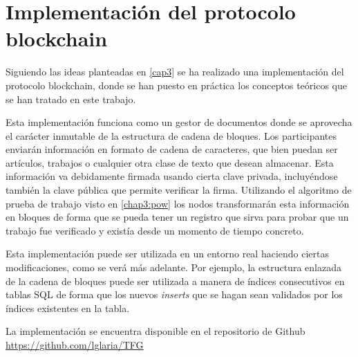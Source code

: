 \cleardoublepage

\chapter{Implementación del protocolo blockchain}
Siguiendo las ideas planteadas en \ref{cap3} se ha realizado una implementación del protocolo blockchain, donde se han puesto en práctica los conceptos teóricos que se han tratado en este trabajo. 


Esta implementación funciona como un gestor de documentos donde se aprovecha el carácter inmutable de la estructura de cadena de bloques. Los participantes enviarán información en formato de cadena de caracteres, que bien puedan ser artículos, trabajos o cualquier otra clase de texto que desean almacenar. Esta información va debidamente firmada usando cierta clave privada, incluyéndose también la clave pública que permite verificar la firma. Utilizando el algoritmo de prueba de trabajo visto en \ref{chap3:pow} los nodos transformarán esta información en bloques de forma que se pueda tener un registro que sirva para probar que un trabajo fue verificado y existía desde un momento de tiempo concreto.

Esta implementación puede ser utilizada en un entorno real haciendo ciertas modificaciones, como se verá más adelante. Por ejemplo, la estructura enlazada de la cadena de bloques puede ser utilizada a manera de índices consecutivos en tablas SQL de forma que los nuevos \textit{inserts} que se hagan sean validados por los índices existentes en la tabla.


La implementación se encuentra disponible en el repositorio de Github \url{https://github.com/lglaria/TFG}

